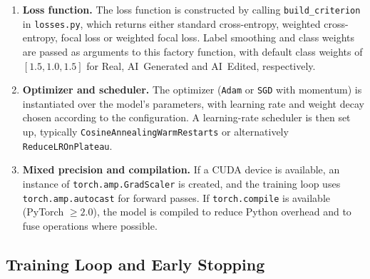 \begin{enumerate}
  \item \textbf{Loss function.} The loss function is constructed by calling \texttt{build\_criterion} in \texttt{losses.py}, which returns either standard cross-entropy, weighted cross-entropy, focal loss or weighted focal loss. Label smoothing and class weights are passed as arguments to this factory function, with default class weights of $[1.5, 1.0, 1.5]$ for Real, AI~Generated and AI~Edited, respectively.
  \item \textbf{Optimizer and scheduler.} The optimizer (\texttt{Adam} or \texttt{SGD} with momentum) is instantiated over the model's parameters, with learning rate and weight decay chosen according to the configuration. A learning-rate scheduler is then set up, typically \texttt{CosineAnnealingWarmRestarts} or alternatively \texttt{ReduceLROnPlateau}.
  \item \textbf{Mixed precision and compilation.} If a CUDA device is available, an instance of \texttt{torch.amp.GradScaler} is created, and the training loop uses \texttt{torch.amp.autocast} for forward passes. If \texttt{torch.compile} is available (PyTorch $\geq 2.0$), the model is compiled to reduce Python overhead and to fuse operations where possible.
\end{enumerate}

\subsection{Training Loop and Early Stopping}


